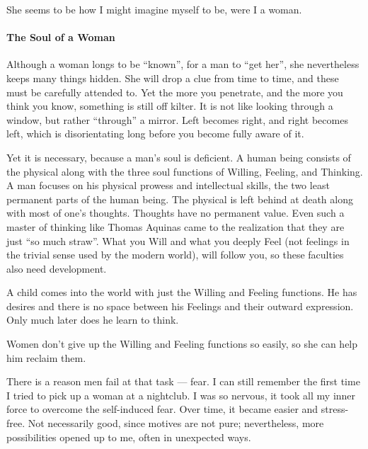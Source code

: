 She seems to be how I might imagine myself to be, were I a woman.

\paragraph{The Soul of a Woman}
Although a woman longs to be “known”, for a man to “get her”, she nevertheless keeps many things hidden. She will drop a clue from time to time, and these must be carefully attended to. Yet the more you penetrate, and the more you think you know, something is still off kilter. It is not like looking through a window, but rather “through” a mirror. Left becomes right, and right becomes left, which is disorientating long before you become fully aware of it.

Yet it is necessary, because a man's soul is deficient. A human being consists of the physical along with the three soul functions of Willing, Feeling, and Thinking. A man focuses on his physical prowess and intellectual skills, the two least permanent parts of the human being. The physical is left behind at death along with most of one's thoughts. Thoughts have no permanent value. Even such a master of thinking like Thomas Aquinas came to the realization that they are just “so much straw”. What you Will and what you deeply Feel (not feelings in the trivial sense used by the modern world), will follow you, so these faculties also need development.

A child comes into the world with just the Willing and Feeling functions. He has desires and there is no space between his Feelings and their outward expression. Only much later does he learn to think.

Women don't give up the Willing and Feeling functions so easily, so she can help him reclaim them.

There is a reason men fail at that task — fear. I can still remember the first time I tried to pick up a woman at a nightclub. I was so nervous, it took all my inner force to overcome the self-induced fear. Over time, it became easier and stress-free. Not necessarily good, since motives are not pure; nevertheless, more possibilities opened up to me, often in unexpected ways.

